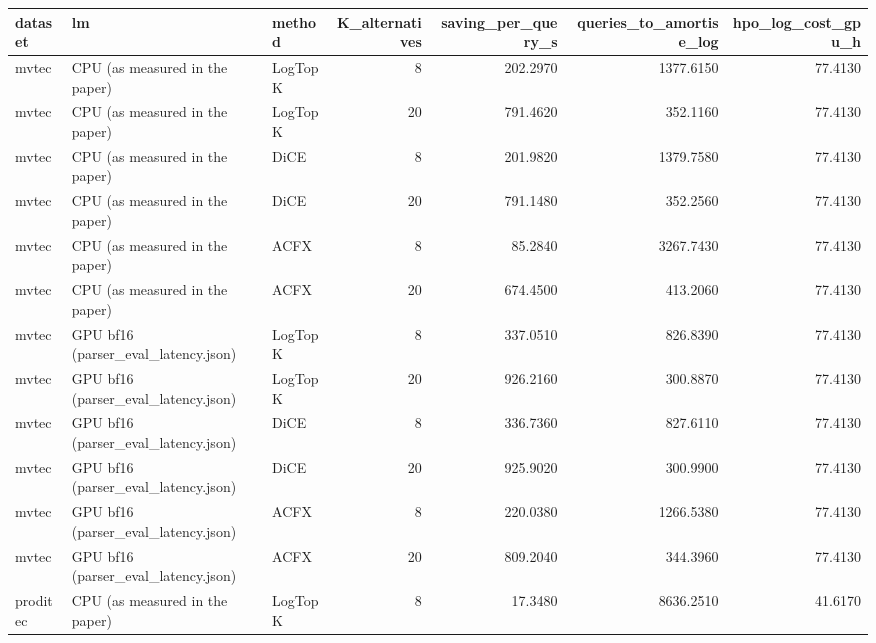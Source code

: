 \begin{tabular}{lllrrrr}
\toprule
 dataset &                                  lm &  method &  K\_alternatives &  saving\_per\_query\_s &  queries\_to\_amortise\_log &  hpo\_log\_cost\_gpu\_h \\
\midrule
   mvtec &      CPU (as measured in the paper) & LogTopK &               8 &            202.2970 &                1377.6150 &             77.4130 \\
   mvtec &      CPU (as measured in the paper) & LogTopK &              20 &            791.4620 &                 352.1160 &             77.4130 \\
   mvtec &      CPU (as measured in the paper) &    DiCE &               8 &            201.9820 &                1379.7580 &             77.4130 \\
   mvtec &      CPU (as measured in the paper) &    DiCE &              20 &            791.1480 &                 352.2560 &             77.4130 \\
   mvtec &      CPU (as measured in the paper) &    ACFX &               8 &             85.2840 &                3267.7430 &             77.4130 \\
   mvtec &      CPU (as measured in the paper) &    ACFX &              20 &            674.4500 &                 413.2060 &             77.4130 \\
   mvtec & GPU bf16 (parser\_eval\_latency.json) & LogTopK &               8 &            337.0510 &                 826.8390 &             77.4130 \\
   mvtec & GPU bf16 (parser\_eval\_latency.json) & LogTopK &              20 &            926.2160 &                 300.8870 &             77.4130 \\
   mvtec & GPU bf16 (parser\_eval\_latency.json) &    DiCE &               8 &            336.7360 &                 827.6110 &             77.4130 \\
   mvtec & GPU bf16 (parser\_eval\_latency.json) &    DiCE &              20 &            925.9020 &                 300.9900 &             77.4130 \\
   mvtec & GPU bf16 (parser\_eval\_latency.json) &    ACFX &               8 &            220.0380 &                1266.5380 &             77.4130 \\
   mvtec & GPU bf16 (parser\_eval\_latency.json) &    ACFX &              20 &            809.2040 &                 344.3960 &             77.4130 \\
proditec &      CPU (as measured in the paper) & LogTopK &               8 &             17.3480 &                8636.2510 &             41.6170 \\

\end{tabular}
